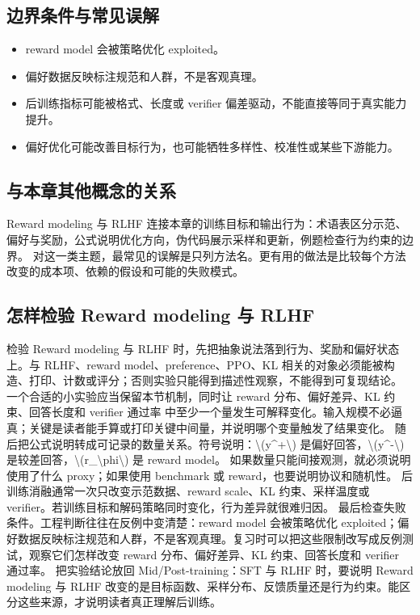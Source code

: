 \documentclass[a4paper]{article}
\begin{document}
\subsection{边界条件与常见误解}
\begin{itemize}
\item reward model 会被策略优化 exploited。
\item 偏好数据反映标注规范和人群，不是客观真理。
\item 后训练指标可能被格式、长度或 verifier 偏差驱动，不能直接等同于真实能力提升。
\item 偏好优化可能改善目标行为，也可能牺牲多样性、校准性或某些下游能力。
\end{itemize}
\subsection{与本章其他概念的关系}
Reward modeling 与 RLHF 连接本章的训练目标和输出行为：术语表区分示范、偏好与奖励，公式说明优化方向，伪代码展示采样和更新，例题检查行为约束的边界。
对这一类主题，最常见的误解是只列方法名。更有用的做法是比较每个方法改变的成本项、依赖的假设和可能的失败模式。
\subsection{怎样检验 Reward modeling 与 RLHF}
检验 Reward modeling 与 RLHF 时，先把抽象说法落到行为、奖励和偏好状态上。与 RLHF、reward model、preference、PPO、KL 相关的对象必须能被构造、打印、计数或评分；否则实验只能得到描述性观察，不能得到可复现结论。
一个合适的小实验应当保留本节机制，同时让 reward 分布、偏好差异、KL 约束、回答长度和 verifier 通过率 中至少一个量发生可解释变化。输入规模不必逼真；关键是读者能手算或打印关键中间量，并说明哪个变量触发了结果变化。
随后把公式说明转成可记录的数量关系。符号说明：\textbackslash{}(y\textasciicircum{}+\textbackslash{}) 是偏好回答，\textbackslash{}(y\textasciicircum{}-\textbackslash{}) 是较差回答，\textbackslash{}(r\_\textbackslash{}phi\textbackslash{}) 是 reward model。 如果数量只能间接观测，就必须说明使用了什么 proxy；如果使用 benchmark 或 reward，也要说明协议和随机性。
后训练消融通常一次只改变示范数据、reward scale、KL 约束、采样温度或 verifier。若训练目标和解码策略同时变化，行为差异就很难归因。
最后检查失败条件。工程判断往往在反例中变清楚：reward model 会被策略优化 exploited；偏好数据反映标注规范和人群，不是客观真理。复习时可以把这些限制改写成反例测试，观察它们怎样改变 reward 分布、偏好差异、KL 约束、回答长度和 verifier 通过率。
把实验结论放回 Mid/Post-training：SFT 与 RLHF 时，要说明 Reward modeling 与 RLHF 改变的是目标函数、采样分布、反馈质量还是行为约束。能区分这些来源，才说明读者真正理解后训练。
\end{document}
